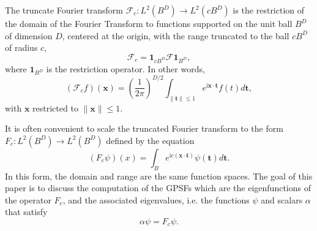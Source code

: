 \documentclass[12pt]{article}
\begin{document}
The truncate Fourier transform $\mathcal{F}_c : L^2(B^D) \rightarrow L^2(c B^D)$ is the restriction of the domain of the Fourier Transform
to functions supported on the unit ball $B^D$ of dimension $D$, centered at the origin, with the range truncated to the ball $c B^D$ of radius $c$,
\begin{equation}\label{eq:def:truncated_Fourier}
  \mathcal{F}_c = {\bm 1}_{c B^D} \mathcal{F} {\bm 1}_{B^D} ,
\end{equation}
where ${\bm 1}_{B^D}$ is the restriction operator. 
In other words,
\begin{equation}
  \left(\mathcal{F}_c f \right)({\bm x}) = \left(\frac{1}{2 \pi }\right)^{D/2} \int_{\|{\bm t}\| \leq 1} e^{ \mathrm{i}  {\bm{x}} \cdot {\bm{t}}  } f(t)  {d}{\bm t} ,
\end{equation}
with ${\bm x}$ restricted to $\|{\bm x}\| \leq 1$.

It is often convenient to scale the truncated Fourier transform to the form ${F}_c : L^2(B^D) \rightarrow L^2(B^D)$ defined by the equation
\begin{equation}\label{eq:scaled_truncated_fourier}
  \left({F}_c \psi \right)(x) = \int_B e^{ \mathrm{i} c \left( {\bm{x}} \cdot {\bm{t}} \right) } \psi(\bm{t})  {d}\bm{t} .
  \end{equation}
In this form, the domain and range are the same function spaces. 
The goal of this paper is to discuss the computation of the GPSFs which are the eigenfunctions of the operator ${F}_c$,
and the associated eigenvalues, i.e. the functions $\psi$ and scalars $\alpha$ that satisfy 
\begin{equation}\label{eq:scaled_truncated_fourier_eig}
 \alpha \psi =  {F}_c \psi .
  \end{equation}


%
%
%
\end{document}
